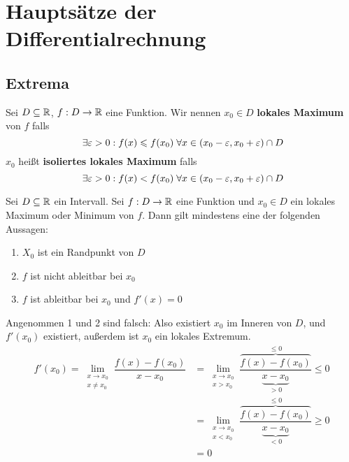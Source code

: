 \documentclass[main.tex]{subfiles}
\begin{document}
\section{Hauptsätze der Differentialrechnung}

\subsection{Extrema}

\begin{Definition}
  Sei $D \subseteq \mathbb{R}$, $f:D \to \mathbb{R}$ eine Funktion. Wir nennen $x_0 \in D$ \textbf{lokales Maximum} von $f$ falls
  $$\;\exists \varepsilon > 0 : f(x) \leqslant f(x_0) \;\forall x \in (x_0 - \varepsilon, x_0 + \varepsilon) \cap D$$
  $x_0$ heißt \textbf{isoliertes lokales Maximum} falls
  $$\;\exists \varepsilon > 0 : f(x) < f(x_0) \;\forall x \in (x_0 - \varepsilon, x_0 + \varepsilon) \cap D$$
\end{Definition}

\begin{Theorem}
  Sei $D \subseteq \mathbb{R}$ ein Intervall. Sei $f : D \to \mathbb{R}$ eine Funktion und $x_0 \in D$ ein lokales Maximum oder Minimum von $f$. Dann gilt mindestens eine der folgenden Aussagen:
  \begin{enumerate}
    \item $X_0$ ist ein Randpunkt von $D$
    \item $f$ ist nicht ableitbar bei $x_0$
    \item $f$ ist ableitbar bei $x_0$ und $f'(x) = 0$
  \end{enumerate}
\end{Theorem}

\begin{Beweis}
  Angenommen 1 und 2 sind falsch: Also existiert $x_0$ im Inneren von $D$, und $f'(x_0)$ existiert, außerdem ist $x_0$ ein lokales Extremum.
  $$\begin{aligned}
    f'(x_0) = \lim \limits_{\substack{x \to x_0 \\ x \neq x_0}} \dfrac{f(x) - f(x_0)}{x - x_0}
    &=\lim \limits_{\substack{x \to x_0 \\ x > x_0}} \dfrac{\overbrace{f(x) - f(x_0)}^{\leq 0}}{\underbrace{x - x_0}_{>0}} \leq 0\\
    &= \lim \limits_{\substack{x \to x_0 \\ x < x_0}} \dfrac{\overbrace{f(x) - f(x_0)}^{\leq 0}}{\underbrace{x - x_0}_{<0}} \geq 0\\
    &= 0
  \end{aligned}$$
\end{Beweis}
\end{document}
